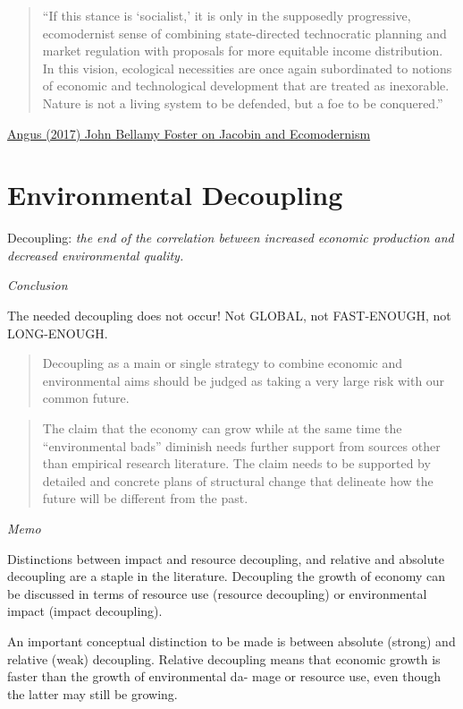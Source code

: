 \documentclass[
]{book}
\begin{document}
\begin{quote}
``If this stance is `socialist,' it is only in the supposedly progressive, ecomodernist sense of combining state-directed technocratic planning and market regulation with proposals for more equitable income distribution. In this vision, ecological necessities are once again subordinated to notions of economic and technological development that are treated as inexorable. Nature is not a living system to be defended, but a foe to be conquered.''
\end{quote}

\href{https://climateandcapitalism.com/2017/11/02/john-bellamy-foster-on-jacobin-and-ecomodernism/}{Angus (2017) John Bellamy Foster on Jacobin and Ecomodernism}

\hypertarget{environmental-decoupling}{%
\section{Environmental Decoupling}\label{environmental-decoupling}}

Decoupling: \emph{the end of the correlation between increased economic production and
decreased environmental quality.}

\emph{Conclusion}

The needed decoupling does not occur! Not GLOBAL, not FAST-ENOUGH, not LONG-ENOUGH.

\begin{quote}
Decoupling as a main or single strategy to combine
economic and environmental aims should be judged as taking a very
large risk with our common future.
\end{quote}

\begin{quote}
The claim that the economy can grow
while at the same time the ``environmental bads'' diminish needs further
support from sources other than empirical research literature. The
claim needs to be supported by detailed and concrete plans of structural
change that delineate how the future will be different from the past.
\end{quote}

\emph{Memo}

Distinctions between impact and resource decoupling,
and relative and absolute decoupling are a staple in the
literature.
Decoupling the growth of economy can be discussed
in terms of resource use (resource decoupling) or environmental impact
(impact decoupling).

An important conceptual distinction to be made is between absolute
(strong) and relative (weak) decoupling. Relative decoupling means
that economic growth is faster than the growth of environmental da-
mage or resource use, even though the latter may still be growing.
\end{document}
